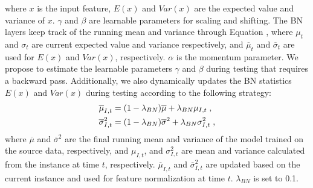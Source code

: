 where $x$ is the input feature, $E(x)$ and $Var(x)$ are the expected value and variance of $x$. $\gamma$ and $\beta$ are learnable parameters for scaling and shifting. The BN layers keep track of the running mean and variance through Equation , where ${\mu}_t$ and ${\sigma}_{t}$ are current expected value and variance respectively, and $\overline{\mu}_t$ and $\overline{\sigma}_{t}$ are used for $E(x)$ and $Var(x)$, respectively. $\alpha$ is the momentum parameter. We propose to estimate the learnable parameters $\gamma$ and $\beta$ during testing that requires a backward pass. Additionally, we also dynamically updates the BN statistics $E(x)$ and $Var(x)$ during testing according to the following strategy:
\begin{equation}
  \centering
  \label{eq:bn_update}
      \begin{aligned}  
          \overline{\mu}_{I,t} &= (1-\lambda{_{BN}}) \overline{\mu} +  \lambda{_{BN}} \mu_{I,t} \; ,\\
          \overline{\sigma}_{I,t}^2 &= (1-\lambda{_{BN}}) \overline{\sigma}^2 +  \lambda{_{BN}} \sigma_{I,t}^2 \; ,
      \end{aligned}
\end{equation}
where $\overline{\mu}$ and $\overline{\sigma}^2$ are the final running mean and variance of the model trained on the source data, respectively, and $\mu_{I,t}$, and $\sigma_{I,t}^2$ are mean and variance calculated from the instance at time $t$, respectively. $\overline{\mu}_{I,t}$ and $\overline{\sigma}_{I,t}^2$ are updated based on the current instance and used for feature normalization at time $t$. $ \lambda{_{BN}}$ is set to 0.1. 
